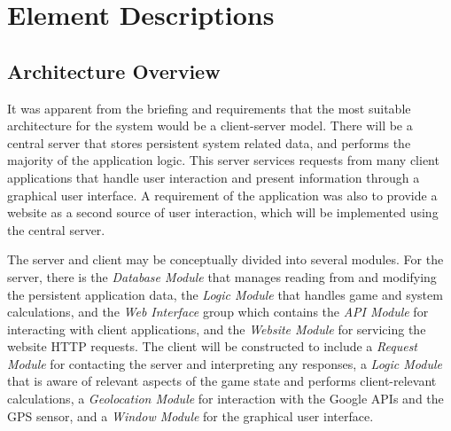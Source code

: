 \def\TabS#1#2{\small\tabular{#1}\rule[-1.5mm]{0pt}{5mm}{#2}
    \rule[-2mm]{0pt}{2mm}\endtabular\hspace{-1mm}}
\def\TabM#1#2{\tabular{#1}\rule[-1.5mm]{0pt}{7mm}{#2}
    \rule[-3mm]{0pt}{4mm}\endtabular\hspace{-1mm}}
\def\TabA#1#2#3{\small\tabular{#1}\rule[-1.5mm]{0pt}{5mm}\textbf{#2}\\
    \hline\rule[0mm]{0pt}{4mm}#3
    \rule[-2mm]{0pt}{2mm}\endtabular}
\def\TabB#1#2#3{\small\tabular{c}\rule[-1.5mm]{0pt}{5mm}
    \textbf{{\tiny$\ll$}#1{\tiny$\gg$}}\\
    \hline\rule[0mm]{0pt}{4mm}\tabular{ll}#2\endtabular \\
    \hline\rule[0mm]{0pt}{4mm}\tabular{ll}#3\endtabular
    \rule[-2mm]{0pt}{2mm}\endtabular}

\setcounter{section}{2}
\section{Element Descriptions}
\setcounter{subsection}{-1}
\subsection{Architecture Overview}
It was apparent from the briefing and requirements that the most suitable architecture for the system would be a client-server model. There will be a central server that stores persistent system related data, and performs the majority of the application logic. This server services requests from many client applications that handle user interaction and present information through a graphical user interface. A requirement of the application was also to provide a website as a second source of user interaction, which will be implemented using the central server.

The server and client may be conceptually divided into several modules. For the server, there is the \emph{Database Module} that manages reading from and modifying the persistent application data, the \emph{Logic Module} that handles game and system calculations, and the \emph{Web Interface} group which contains the \emph{API Module} for interacting with client applications, and the \emph{Website Module} for servicing the website HTTP requests. The client will be constructed to include a \emph{Request Module} for contacting the server and interpreting any responses, a \emph{Logic Module} that is aware of relevant aspects of the game state and performs client-relevant calculations, a \emph{Geolocation Module} for interaction with the Google APIs and the GPS sensor, and a \emph{Window Module} for the graphical user interface.

